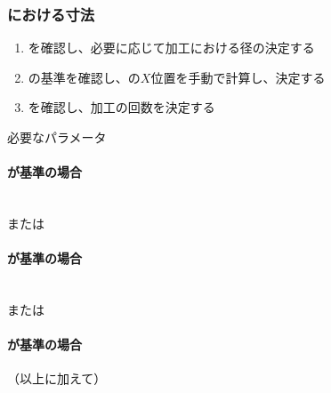\clearpage
\subsubsection{\Keyway における寸法}
\begin{enumerate}[label=\sarrow]
\item \KeywayType を確認し、必要に応じて加工における径の決定する
\item {}\nameKeywayCenter の基準を確認し、\KeywayCenter の$X$位置を手動で計算し、決定する
\item \KeywayWidth を確認し、加工の回数を決定する
\end{enumerate}
\begin{Parameter}{必要なパラメータ}
\paragraph*{\CenterCurvatureLine が基準の場合}
\PMKeywayACOD
\PMKeywayBDOD
\PMKeywayPos
\PMKeywayWidth
\PMCenterCurvatureRadius\\
\PMKeywayCornerR または\PMKeywayCornerC
\tcbline*
\paragraph*{\OutcutCenter が基準の場合}
\PMKeywayACOD
\PMKeywayBDOD
\PMKeywayPos
\PMKeywayWidth\\
\PMKeywayCornerR または\PMKeywayCornerC
\tcbline*
\paragraph*{\AsideKeywayDepth が基準の場合}
（以上に加えて）\PMAsideKeywayDepth
\end{Parameter}

\clearpage
